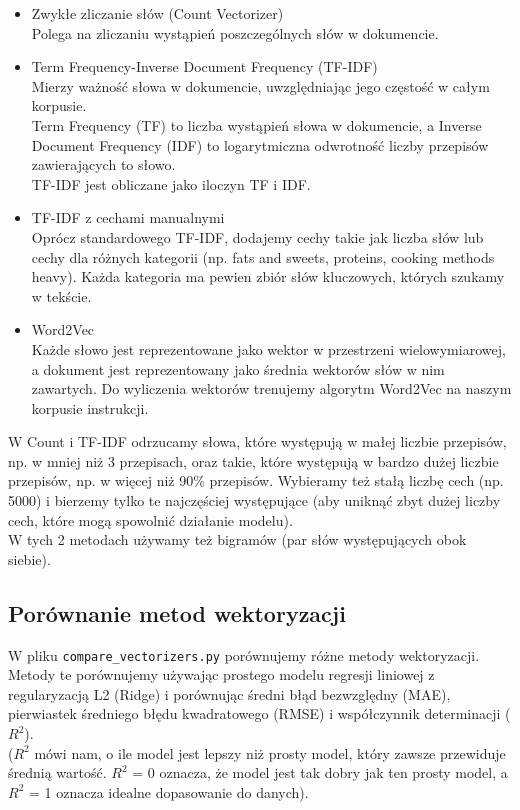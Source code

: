 \documentclass[12pt,a4paper]{article}
\begin{document}
\begin{itemize}
    \item Zwykłe zliczanie słów (Count Vectorizer) \\
        Polega na zliczaniu wystąpień poszczególnych słów w dokumencie.
    \item Term Frequency-Inverse Document Frequency (TF-IDF) \\
        Mierzy ważność słowa w dokumencie, uwzględniając jego częstość w całym korpusie. \\
        Term Frequency (TF) to liczba wystąpień słowa w dokumencie, a Inverse Document Frequency (IDF) to logarytmiczna odwrotność liczby przepisów zawierających to słowo. \\
        TF-IDF jest obliczane jako iloczyn TF i IDF.
    \item TF-IDF z cechami manualnymi \\
        Oprócz standardowego TF-IDF, dodajemy cechy takie jak liczba słów lub cechy dla różnych kategorii (np. fats and sweets, proteins, cooking methods heavy). Każda kategoria ma pewien zbiór słów kluczowych, których szukamy w tekście.
    \item Word2Vec \\
        Każde słowo jest reprezentowane jako wektor w przestrzeni wielowymiarowej, a dokument jest reprezentowany jako średnia wektorów słów w nim zawartych. Do wyliczenia wektorów trenujemy algorytm Word2Vec na naszym korpusie instrukcji.
\end{itemize}

\noindent W Count i TF-IDF odrzucamy słowa, które występują w małej liczbie przepisów, np. w mniej niż 3 przepisach, oraz takie, które występują w bardzo dużej liczbie przepisów, np. w więcej niż 90\% przepisów. Wybieramy też stałą liczbę cech (np. 5000) i bierzemy tylko te najczęściej występujące (aby uniknąć zbyt dużej liczby cech, które mogą spowolnić działanie modelu). \\
\noindent W tych 2 metodach używamy też bigramów (par słów występujących obok siebie). 

\subsection*{Porównanie metod wektoryzacji}

\noindent W pliku \texttt{compare\_vectorizers.py} porównujemy różne metody wektoryzacji. \\

\noindent Metody te porównujemy używając prostego modelu regresji liniowej z regularyzacją L2 (Ridge) i porównując średni błąd bezwzględny (MAE), pierwiastek średniego błędu kwadratowego (RMSE) i współczynnik determinacji ($R^2$). \\
\noindent ($R^2$ mówi nam, o ile model jest lepszy niż prosty model, który zawsze przewiduje średnią wartość. $R^2$ = 0 oznacza, że model jest tak dobry jak ten prosty model, a $R^2$ = 1 oznacza idealne dopasowanie do danych).\\
\end{document}
